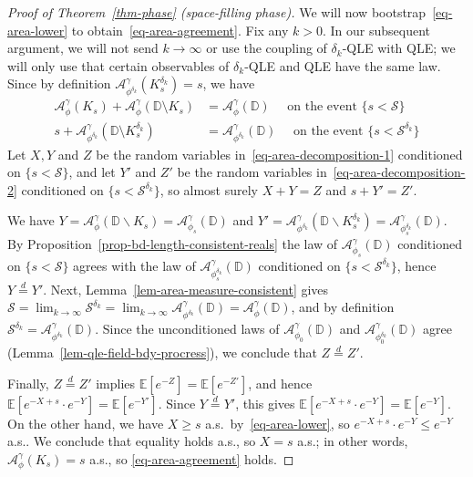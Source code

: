 \documentclass[a4paper]{article}
\numberwithin{equation}{section}
\newcommand{\D}{\mathbb{D}}
\newcommand{\E}{\mathbb{E}}
\newcommand{\cA}{\mathcal{A}}
\newcommand{\qduration}{\mathcal{S}}
\theoremstyle{remark}
\numberwithin{equation}{section}
\begin{document}
\begin{proof}[{Proof of Theorem~\ref{thm-phase} (space-filling phase)}]
    We will now bootstrap~\eqref{eq-area-lower} to obtain~\eqref{eq-area-agreement}.  Fix any $k > 0$. In our subsequent argument, we will not send $k \to \infty$ or use the coupling of $\delta_k$-QLE with QLE; we will only use that certain observables of $\delta_k$-QLE and QLE have the same law. Since by definition $\cA^\gamma_{\phi^{\delta_k}}(K^{\delta_k}_s) = s$, we have 
    \begin{align}\label{eq-area-decomposition-1}
        \cA^\gamma_{\phi}(K_{s}) + \cA^\gamma_{\phi}(\D \setminus K_s) &= \cA^\gamma_{\phi}(\D) \quad \text{ on the event } \{s < \qduration \} \\
        s +  \cA^\gamma_{\phi^{\delta_k}}(\D \setminus K_{s}^{\delta_k}) &= \cA^\gamma_{\phi^{\delta_k}}(\D) \quad \text{ on the event } \{s < \qduration^{\delta_k} \} \label{eq-area-decomposition-2}
    \end{align}
    Let $X,Y$ and $Z$ be the random variables in~\eqref{eq-area-decomposition-1} conditioned on $\{ s < \qduration\}$, and let $Y'$ and $Z'$ be the random variables in~\eqref{eq-area-decomposition-2} conditioned on $\{ s < \qduration^{\delta_k}\}$, so almost surely $X+Y=Z$ and $s + Y' = Z'$. 

    We have $Y = \cA^\gamma_{\phi}(\D \backslash K_{s}) = \cA^\gamma_{\phi_s}(\D)$ and $Y' = \cA^\gamma_{\phi^{\delta_k}}(\D \backslash K_{s}^{\delta_k}) = \cA^\gamma_{\phi_s^{\delta_k}}(\D)$.  
    By Proposition~\ref{prop-bd-length-consistent-reals} the law of $\cA^\gamma_{\phi_s}(\D)$ conditioned on $\{ s < \qduration\}$ agrees with the law of $\cA^\gamma_{\phi_s^{\delta_k}}(\D)$ conditioned on $\{ s < \qduration^{\delta_k}\}$, hence $Y \stackrel d= Y'$. 
    Next, Lemma~\ref{lem-area-measure-consistent} gives $\qduration = \lim_{k \to \infty} \qduration^{\delta_k} = \lim_{ k \to \infty} \cA^\gamma_{\phi^{\delta_k}}(\D) = \cA^\gamma_{\phi}(\D)$, and by definition $\qduration^{\delta_k} = \cA^\gamma_{\phi^{\delta_k}}(\D)$. Since the unconditioned laws of $\cA^\gamma_{\phi_0}(\D)$ and $\cA^\gamma_{\phi_0^{\delta_k}}(\D)$ agree (Lemma~\ref{lem-qle-field-bdy-procress}), we conclude that $Z \stackrel d= Z'$. 

    Finally, $Z \stackrel d= Z'$ implies $\E[e^{-Z}] = \E[e^{-Z'}]$, and hence $\E[e^{-X + s} \cdot e^{-Y}] = \E[e^{-Y'}]$. Since $Y \stackrel d= Y'$, this gives $\E[e^{-X + s} \cdot e^{-Y}] = \E[e^{-Y}]$. On the other hand,  we have $X \geq s$ a.s.\  by~\eqref{eq-area-lower}, so $e^{-X+s} \cdot e^{-Y} \leq e^{-Y}$ a.s.. We conclude that equality holds a.s., so $X = s$ a.s.; in other words,  $\cA^\gamma_{\phi}(K_s) = s$ a.s., so \eqref{eq-area-agreement} holds. 
\end{proof}
\end{document}
